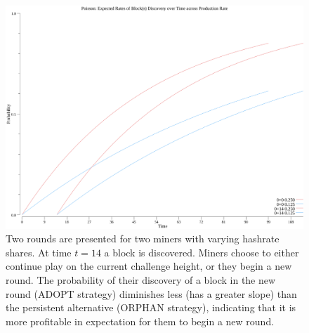 \documentclass[11pt]{article}
\theoremstyle{plain}
\begin{document}
{\begin{figure}[tph]
    \centering
    \includegraphics[width=1.0\textwidth]{imgs/vis_poisson_game_redblue.png}
    \caption{
        Two rounds are presented for two miners with varying hashrate shares.
        At time $t=14$ a block is discovered.
        Miners choose to either continue play on the current challenge height,
        or they begin a new round.
        The probability of their discovery of a block in the new round (ADOPT strategy) diminishes less
        (has a greater slope) than the persistent alternative (ORPHAN strategy),
        indicating that it is more profitable in expectation for them to begin a new round.
    }
    \label{fig:vis_poisson_game_redblue}
\end{figure}

\clearpage

}
\end{document}
